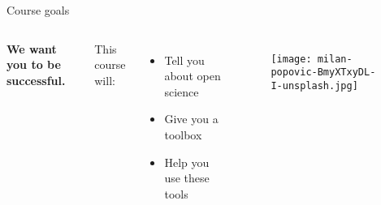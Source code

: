 
\begin{frame}{Course goals}

\begin{columns}[t]

    \textbf{We want you to be successful.}
    \vspace{3ex}
    

    This course will:
    \begin{itemize}
        \item Tell you about open science
        \item Give you a toolbox
        \item Help you use these tools
    \end{itemize}


    \begin{figure}
        \centering
        \texttt{[image: milan-popovic-BmyXTxyDL-I-unsplash.jpg]}
        \label{fig:tools}\\
    \end{figure}

\end{columns}


\end{frame}


